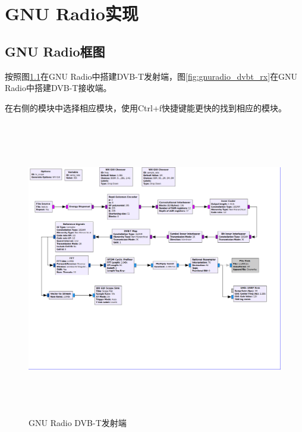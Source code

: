 \chapter{GNU Radio实现}
	\section{GNU Radio框图}
		\par 按照图\ref{fig:gnuradio_dvbt_tx}在GNU Radio中搭建DVB-T发射端，图\ref{fig:gnuradio_dvbt_rx}在GNU Radio中搭建DVB-T接收端。
		\par 在右侧的模块中选择相应模块，使用Ctrl+f快捷键能更快的找到相应的模块。
		\begin{figure}[htb]
			\centering
			\includegraphics[height=13cm,angle=-90]{figures/dvbt_tx.png}
			\caption{GNU Radio DVB-T发射端}
			\label{fig:gnuradio_dvbt_tx}
		\end{figure}
